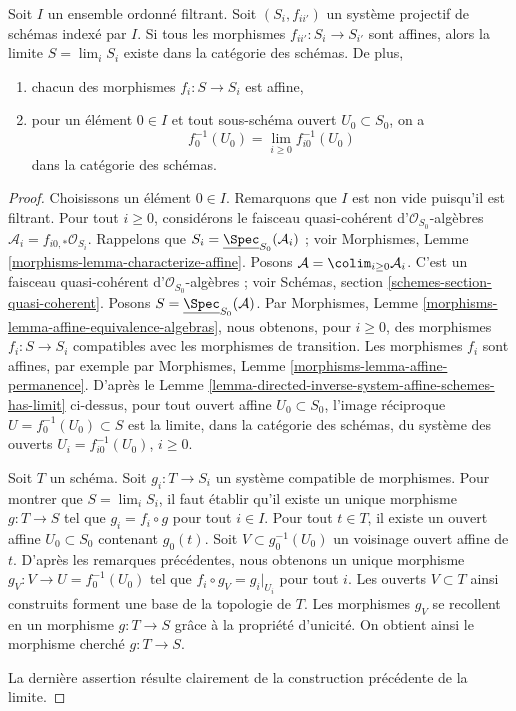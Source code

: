 \begin{lemma}
\label{lemma-directed-inverse-system-has-limit}
Soit $I$ un ensemble ordonné filtrant. Soit $(S_i, f_{ii'})$ un système
projectif de schémas indexé par $I$. Si tous les morphismes
$f_{ii'} : S_i \to S_{i'}$ sont affines, alors la limite $S = \lim_i S_i$
existe dans la catégorie des schémas. De plus,
\begin{enumerate}
\item chacun des morphismes $f_i : S \to S_i$ est affine,
\item pour un élément $0 \in I$ et tout sous-schéma ouvert
$U_0 \subset S_0$, on a
$$
f_0^{-1}(U_0) = \lim_{i \geq 0} f_{i0}^{-1}(U_0)
$$
dans la catégorie des schémas.
\end{enumerate}
\end{lemma}

\begin{proof}
Choisissons un élément $0 \in I$. Remarquons que $I$ est non vide puisqu'il
est filtrant. Pour tout $i \geq 0$, considérons le faisceau quasi-cohérent
d'$\mathcal{O}_{S_0}$-algèbres
$\mathcal{A}_i = f_{i0, *}\mathcal{O}_{S_i}$. Rappelons que
$S_i = \underline{\Spec}_{S_0}(\mathcal{A}_i)$ ; voir Morphismes,
Lemme \ref{morphisms-lemma-characterize-affine}. Posons
$\mathcal{A} = \colim_{i \geq 0} \mathcal{A}_i$. C'est un faisceau
quasi-cohérent d'$\mathcal{O}_{S_0}$-algèbres ; voir Schémas,
section \ref{schemes-section-quasi-coherent}. Posons
$S = \underline{\Spec}_{S_0}(\mathcal{A})$. Par Morphismes,
Lemme \ref{morphisms-lemma-affine-equivalence-algebras}, nous obtenons,
pour $i \geq 0$, des morphismes $f_i : S \to S_i$ compatibles avec les
morphismes de transition. Les morphismes $f_i$ sont affines, par exemple
par Morphismes, Lemme \ref{morphisms-lemma-affine-permanence}. D'après le
Lemme \ref{lemma-directed-inverse-system-affine-schemes-has-limit} ci-dessus,
pour tout ouvert affine $U_0 \subset S_0$, l'image réciproque
$U = f_0^{-1}(U_0) \subset S$ est la limite, dans la catégorie des schémas,
du système des ouverts $U_i = f_{i0}^{-1}(U_0)$, $i \geq 0$.

\medskip\noindent
Soit $T$ un schéma. Soit $g_i : T \to S_i$ un système compatible de
morphismes. Pour montrer que $S = \lim_i S_i$, il faut établir qu'il existe
un unique morphisme $g : T \to S$ tel que $g_i = f_i \circ g$ pour tout
$i \in I$. Pour tout $t \in T$, il existe un ouvert affine
$U_0 \subset S_0$ contenant $g_0(t)$. Soit
$V \subset g_0^{-1}(U_0)$ un voisinage ouvert affine de $t$.
D'après les remarques précédentes, nous obtenons un unique morphisme
$g_V : V \to U = f_0^{-1}(U_0)$ tel que $f_i \circ g_V = g_i|_{U_i}$
pour tout $i$. Les ouverts $V \subset T$ ainsi construits forment une base
de la topologie de $T$. Les morphismes $g_V$ se recollent en un morphisme
$g : T \to S$ grâce à la propriété d'unicité. On obtient ainsi le morphisme
cherché $g : T \to S$.

\medskip\noindent
La dernière assertion résulte clairement de la construction précédente de
la limite.
\end{proof}

